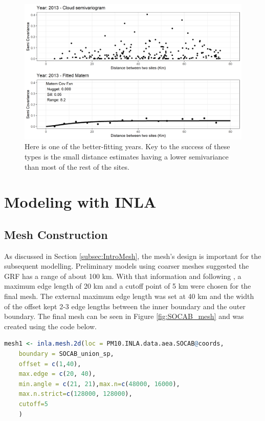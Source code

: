 \documentclass{article}
\begin{document}
\begin{figure}[ht]
	\centering
	\includegraphics[width = 12cm]{Figures/EmpiricalVariograms/Empirical_Variogram_2013.png}
	\caption{Here is one of the better-fitting years.  Key to the success of these types is the small distance estimates having a lower semivariance than most of the rest of the sites.}
	\label{fig:Variogram2013}
\end{figure}

%
\section{Modeling with INLA}
\label{subsec:INLAmodelling}

\subsection{Mesh Construction}
As discussed in Section \ref{subsec:IntroMesh}, the mesh's design is important for the subsequent modelling.  Preliminary models using coarser meshes suggested the \ac{GRF} has a range of about 100 km.   With that information and following \cite{Righetto2020}, a maximum edge length of 20 km and a cutoff point of 5 km were chosen for the final mesh.  The external maximum edge length was set at 40 km and the width of the offset kept 2-3 edge lengths between the inner boundary and the outer boundary.  The final mesh can be seen in Figure \ref{fig:SOCAB_mesh} and was created using the code below.

\begin{lstlisting}[language = R]
	mesh1 <- inla.mesh.2d(loc = PM10.INLA.data.aea.SOCAB@coords, 
	boundary = SOCAB_union_sp,
	offset = c(1,40),
	max.edge = c(20, 40),
	min.angle = c(21, 21),max.n=c(48000, 16000), 
	max.n.strict=c(128000, 128000), 
	cutoff=5
	) 
\end{lstlisting} \label{code:inlaMesh}
\end{document}
